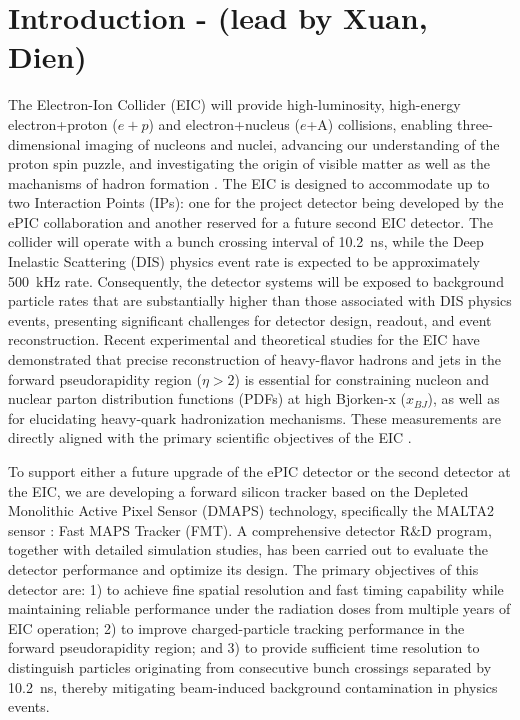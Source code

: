 \documentclass[pdftex,twocolumn,epjc3]{svjour3}          %
\begin{document}
\begin{abstract}
To advance the forward tracking capability at the future Electron-Ion Collider (EIC), a MALTA2-based Fast Monolithic Active Pixel Sensor (MAPS) Tracker is proposed to deliver better than 7$\mu m$ spatial resolution, better than 2ns readout window and high radiation tolerance. 
\end{abstract}

\section{Introduction - (lead by Xuan, Dien)}\label{sec:intro}

The Electron-Ion Collider (EIC) will provide high-luminosity, high-energy electron+proton ($e+p$) and electron+nucleus ($e$+A) collisions, enabling three-dimensional imaging of nucleons and nuclei, advancing our understanding of the proton spin puzzle, and investigating the origin of visible matter as well as the machanisms of hadron formation \cite{Abdul_Khalek_2022}. The EIC is designed to accommodate up to two Interaction Points (IPs): one for the project detector being developed by the ePIC collaboration and another reserved for a future second EIC detector. The collider will operate with a bunch crossing interval of 10.2~ns, while the Deep Inelastic Scattering (DIS) physics event rate is expected to be approximately 500~kHz rate. Consequently, the detector systems will be exposed to background particle rates that are substantially higher than those associated with DIS physics events, presenting significant challenges for detector design, readout, and event reconstruction. Recent experimental and theoretical studies for the EIC \cite{Li:2020sru, Li:2021xig, Li:2025lxr, Li:2020zbk, PhysRevLett.126.252001, PhysRevD.104.114039} have demonstrated that precise reconstruction of heavy-flavor hadrons and jets in the forward pseudorapidity region ($\eta > 2$) is essential for constraining nucleon and nuclear parton distribution functions (PDFs) at high Bjorken-x ($x_{BJ}$), as well as for elucidating heavy-quark hadronization mechanisms. These measurements are directly aligned with the primary scientific objectives of the EIC \cite{Abdul_Khalek_2022}. 

To support either a future upgrade of the ePIC detector or the second detector at the EIC, we are developing a forward silicon tracker based on the Depleted Monolithic Active Pixel Sensor (DMAPS) technology, specifically the MALTA2 sensor \cite{MALTA2Cz}: Fast MAPS Tracker (FMT). A comprehensive detector R$\&$D program, together with detailed simulation studies, has been carried out to evaluate the detector performance and optimize its design. The primary objectives of this detector are: 1) to achieve fine spatial resolution and fast timing capability while maintaining reliable performance under the radiation doses from multiple years of EIC operation; 2) to improve charged-particle tracking performance in the forward pseudorapidity region; and 3) to provide sufficient time resolution to distinguish particles originating from consecutive bunch crossings separated by 10.2~ns, thereby mitigating beam-induced background contamination in physics events. 
\end{document}
